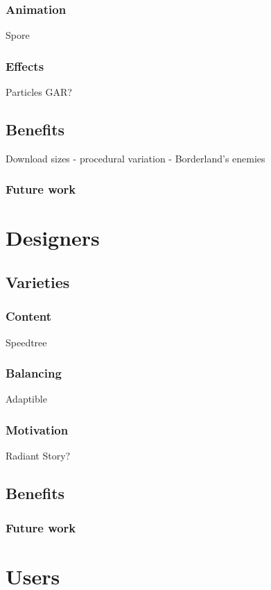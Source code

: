 \documentclass{./acm_proc_article-sp}
\begin{document}
\subsubsection{Animation}
Spore
\subsubsection{Effects}
Particles
GAR?

\subsection{Benefits}
Download sizes - procedural variation - Borderland's enemies
\subsubsection{Future work}

\section{Designers}

\subsection{Varieties}
\subsubsection{Content}
Speedtree
\subsubsection{Balancing}
Adaptible
\subsubsection{Motivation}
Radiant Story?

\subsection{Benefits}
\subsubsection{Future work}

\section{Users}
\end{document}
